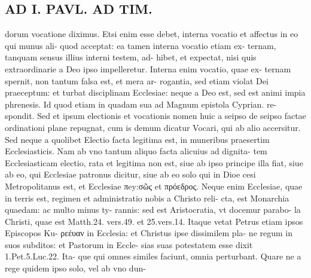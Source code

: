 \documentclass{article}
\begin{document}
\begin{pages}
\section*{AD I. PAVL. AD TIM. }
\marginpar{[ p.340 ]}\pstart dorum vocatione diximus. Etsi enim esse debet, interna vocatio et affectus in eo qui munus ali- quod acceptat: ea tamen interna vocatio etiam ex- ternam, tanquam sensus illius interni testem, ad- hibet, et expectat, nisi quis extraordinarie a Deo ipso impelleretur. Interna enim vocatio, quae ex- ternam spernit, non tantum falsa est, et mera ar- rogantia, sed etiam violat Dei praeceptum: et turbat disciplinam Ecclesiae: neque a Deo est, sed est animi impia phrenesis. Id quod etiam in quadam sua ad Magnum epistola Cyprian. re- spondit. Sed et ipsum electionis et vocationis nomen huic a seipso de seipso factae ordinationi plane repugnat, cum is demum dicatur Vocari, qui ab alio accersitur. Sed neque a quolibet Electio facta legitima est, in muneribus praesertim Ecclesiasticis. Nam ab vno tantum aliquo facta alicuius ad dignita- tem Ecclesiasticam electio, rata et legitima non est, siue ab ipso principe illa fiat, siue ab eo, qui Ecclesiae patronus dicitur, siue ab eo solo qui in Dioe cesi Metropolitanus est, et Ecclesiae πey:σῶς et πρόεδρος. Neque enim Ecclesiae, quae in terris est, regimen et administratio nobis a Christo reli- cta, est Monarchia quaedam: ac multo minus ty- rannis: sed est Aristocratia, vt docemur parabo- la Christi, quae est Matth.24. vers.49. et 25.vers.14. Itaque vetat Petrus etiam ipsos Episcopos Ku- ρεέυαν in Ecclesia: et Christus ipse dissimilem pla- ne regum in suos subditos: et Pastorum in Eccle- sias suas potestatem esse dixit 1.Pet.5.Luc.22. Ita- que qui omnes similes faciunt, omnia perturbant. Quare ne a rege quidem ipso solo, vel ab vno dun-  \pend

\end{pages}
\end{document}
